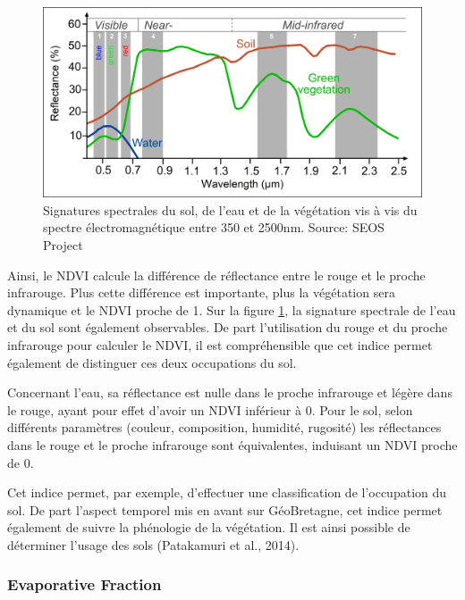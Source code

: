 \documentclass[10pt,a4paper]{article}
\begin{document}
\begin{figure}[!h]
\centering
\includegraphics[scale=0.4]{img/spectral_signatures.jpg}
\caption{Signatures spectrales du sol, de l'eau et de la végétation vis à vis du spectre électromagnétique entre 350 et 2500nm. Source: SEOS Project}
\label{signSpectr}
\end{figure}

Ainsi, le NDVI calcule la différence de réflectance entre le rouge et le proche infrarouge. Plus cette différence est importante, plus la végétation sera dynamique et le NDVI proche de 1. Sur la figure \ref{signSpectr}, la signature spectrale de l'eau et du sol sont également observables. De part l'utilisation du rouge et du proche infrarouge pour calculer le NDVI, il est compréhensible que cet indice permet également de distinguer ces deux occupations du sol.\smallbreak

Concernant l'eau, sa réflectance est nulle dans le proche infrarouge et légère dans le rouge, ayant pour effet d'avoir un NDVI inférieur à 0. Pour le sol, selon différents paramètres (couleur, composition, humidité, rugosité) les réflectances dans le rouge et le proche infrarouge sont équivalentes, induisant un NDVI proche de 0.\smallbreak

Cet indice permet, par exemple, d'effectuer une classification de l'occupation du sol. De part l'aspect temporel mis en avant sur GéoBretagne, cet indice permet également de suivre la phénologie de la végétation. Il est ainsi possible de déterminer l'usage des sols (Patakamuri et al., 2014).

\subsubsection{Evaporative Fraction}
\end{document}
